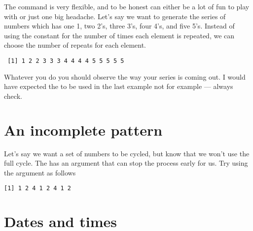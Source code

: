 The  command is very flexible, and to be honest can either be a lot of fun to play with or just one big headache. Let's say we want to generate the series of numbers which has one 1, two 2's, three 3's, four 4's, and five 5's. Instead of using the constant for the number of times each element is repeated, we can choose the number of repeats for each element. 
\begin{knitrout}
\color{fgcolor}\begin{kframe}
\begin{alltt}
\hlstd{> }\hlstd{(}\hlopt{:}\hlstd{,} \hlstd{=}\hlopt{:}\hlstd{)}
\end{alltt}
\begin{verbatim}
 [1] 1 2 2 3 3 3 4 4 4 4 5 5 5 5 5
\end{verbatim}
\end{kframe}
\end{knitrout}
Whatever you do you should observe the way your series is coming out. I would have expected the  to be used in the last example not  for example --- always check. 
 
\section{An incomplete pattern} 
 
Let's say we want a set of numbers to be cycled, but know that we won't use the full cycle. The  has an argument that can stop the process early for us. Try using the  argument as follows 
\begin{knitrout}
\color{fgcolor}\begin{kframe}
\begin{alltt}
\hlstd{> }\hlstd{(}\hlstd{(}\hlstd{,}\hlstd{,}\hlstd{),} \hlstd{=}\hlstd{,} \hlstd{=}\hlstd{)}
\end{alltt}
\begin{verbatim}
[1] 1 2 4 1 2 4 1 2
\end{verbatim}
\end{kframe}
\end{knitrout}
 
 
\section{Dates and times} 
 
